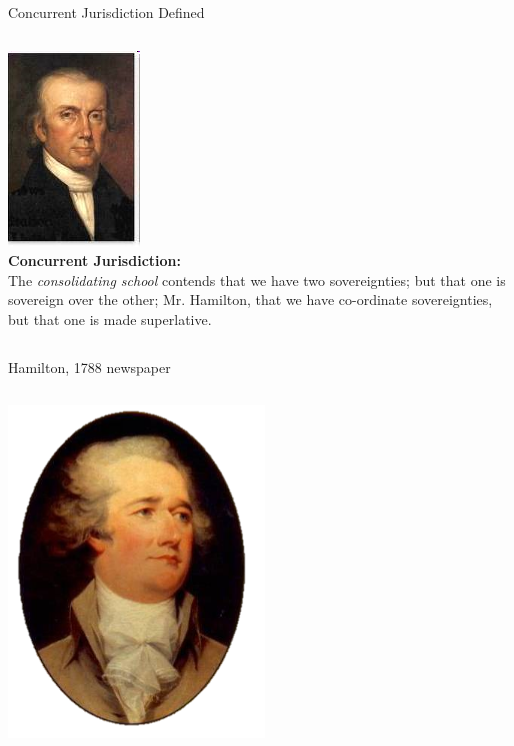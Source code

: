 \begin{frame}{Concurrent Jurisdiction Defined}
    \begin{columns}[c]
            \centering
            \includegraphics[height=0.4\textheight]{img/john-taylor-of-caroline.png} \\
        \column{0.5\textheight}
            \textbf{Concurrent Jurisdiction:} \\
            The \emph{consolidating school} contends that we have two
            sovereignties; but that one is sovereign over the other; Mr.
            Hamilton, that we have co-ordinate sovereignties, but that one is
            made superlative.
    \end{columns}
\end{frame}

\begin{frame}{Hamilton, 1788 newspaper}
    \begin{columns}[c]
            \centering
            \includegraphics[width=0.75\textwidth]{img/hamilton.png} \\
        \column{0.5\textheight}
    \end{columns}
\end{frame}

